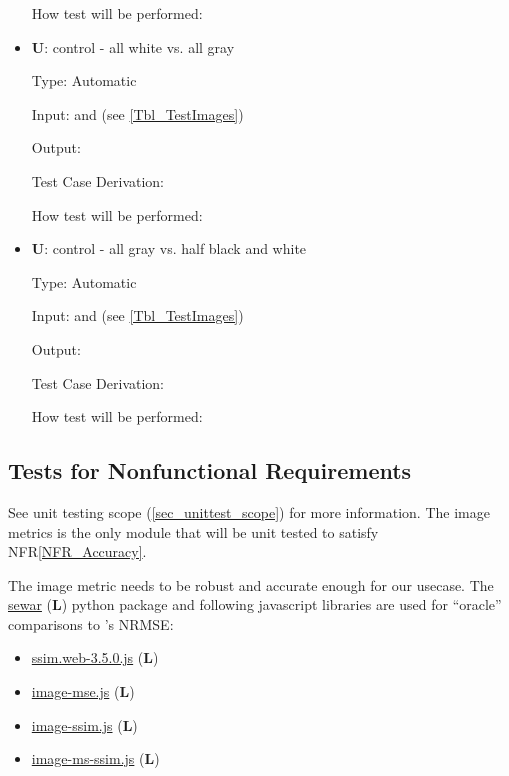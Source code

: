 \documentclass[12pt, titlepage]{article}
\newcommand{\nfrref}[1]{NFR\ref{#1}}
\newcounter{testnum} %
\newcounter{unittestnum} %
\newcounter{libnum} %
\begin{document}
\begin{itemize}
How test will be performed: 


\item{\textbf{U\theunittestnum \label{U_metric5}}: control - all white vs. all gray}

Type: Automatic

Input:  and  (see \ref{Tbl_TestImages})

Output: 

Test Case Derivation: 

How test will be performed: 


\item{\textbf{U\theunittestnum \label{U_metric6}}: control - all gray vs. half black and white}

Type: Automatic

Input:  and  (see \ref{Tbl_TestImages})

Output: 

Test Case Derivation: 

How test will be performed: 

    
\end{itemize}


\newpage

\subsection{Tests for Nonfunctional Requirements}

See unit testing scope (\ref{sec_unittest_scope}) for more information.
The image metrics is the only module that will be unit tested to
satisfy \nfrref{NFR_Accuracy}.

The image metric needs to be robust and accurate enough for our usecase.
The \href{https://pypi.org/project/sewar}{sewar}
(\textbf{L\thelibnum \label{lib_sewar}})
python package 
and following javascript libraries are used for ``oracle'' comparisons
to \progname{}'s NRMSE:
\begin{itemize}
  \item \href{https://github.com/obartra/ssim}{ssim.web-3.5.0.js} (\textbf{L\thelibnum \label{lib_ssim}})
  \item \href{https://github.com/darosh/image-mse-js}{image-mse.js} (\textbf{L\thelibnum \label{lib_mse}})
  \item \href{https://github.com/darosh/image-ssim-js}{image-ssim.js} (\textbf{L\thelibnum \label{lib_ssim1}})
  \item \href{https://github.com/darosh/image-ms-ssim-js}{image-ms-ssim.js} (\textbf{L\thelibnum \label{lib_msssim}})
\end{itemize}
\end{document}
